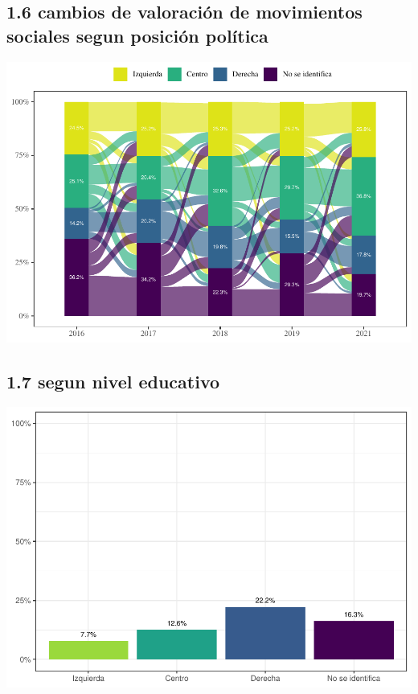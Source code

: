 \documentclass[
  12pt,
  openany]{book}
\begin{document}
\hypertarget{cambios-de-valoraciuxf3n-de-movimientos-sociales-segun-posiciuxf3n-poluxedtica}{%
\subsection{1.6 cambios de valoración de movimientos sociales segun posición política}\label{cambios-de-valoraciuxf3n-de-movimientos-sociales-segun-posiciuxf3n-poluxedtica}}

\includegraphics{reporte-elsoc_files/figure-latex/unnamed-chunk-17-1.pdf}

\hypertarget{segun-nivel-educativo}{%
\subsection{1.7 segun nivel educativo}\label{segun-nivel-educativo}}

\includegraphics{reporte-elsoc_files/figure-latex/unnamed-chunk-19-1.pdf}
\end{document}

